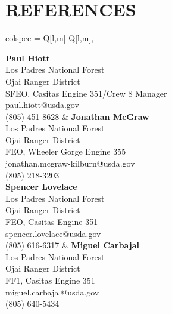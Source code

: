 \documentclass[a4paper,9pt]{extarticle}
\begin{document}
\section*{REFERENCES}

\begin{center}
\begin{tblr}{
    colspec = {Q[l,m] Q[l,m]},
}

{\textbf{Paul Hiott} \\
Los Padres National Forest \\
Ojai Ranger District \\
SFEO, Casitas Engine 351/Crew 8 Manager \\
paul.hiott@usda.gov \\
(805) 451-8628}
&
{\textbf{Jonathan McGraw} \\
Los Padres National Forest \\
Ojai Ranger District \\
FEO, Wheeler Gorge Engine 355 \\
jonathan.mcgraw-kilburn@usda.gov \\
(805) 218-3203} \\

{\textbf{Spencer Lovelace} \\
Los Padres National Forest \\
Ojai Ranger District \\
FEO, Casitas Engine 351 \\
spencer.lovelace@usda.gov \\
(805) 616-6317}
&
{\textbf{Miguel Carbajal} \\
Los Padres National Forest \\
Ojai Ranger District \\
FF1, Casitas Engine 351 \\
miguel.carbajal@usda.gov \\
(805) 640-5434}

\end{tblr}
\end{center}
\end{document}
